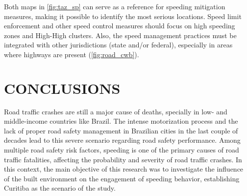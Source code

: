 Both maps in \autoref{fig:taz_sp} can serve as a reference for speeding mitigation measures, making it possible to identify the most serious locations. Speed limit enforcement and other speed control measures should focus on high speeding zones and High-High clusters. Also, the speed management practices must be integrated with other jurisdictions (state and/or federal), especially in areas where highways are present (\autoref{fig:road_cwb}).


\chapter{CONCLUSIONS} \label{cap:conclusion}














Road traffic crashes are still a major cause of deaths, specially in low- and middle-income countries like Brazil. The intense motorization process and the lack of proper road safety management in Brazilian cities in the last couple of decades lead to this severe scenario regarding road safety performance. Among multiple road safety risk factors, speeding is one of the primary causes of road traffic fatalities, affecting the probability and severity of road traffic crashes. In this context, the main objective of this research was to investigate the influence of the built environment on the engagement of speeding behavior, establishing Curitiba as the scenario of the study. 

